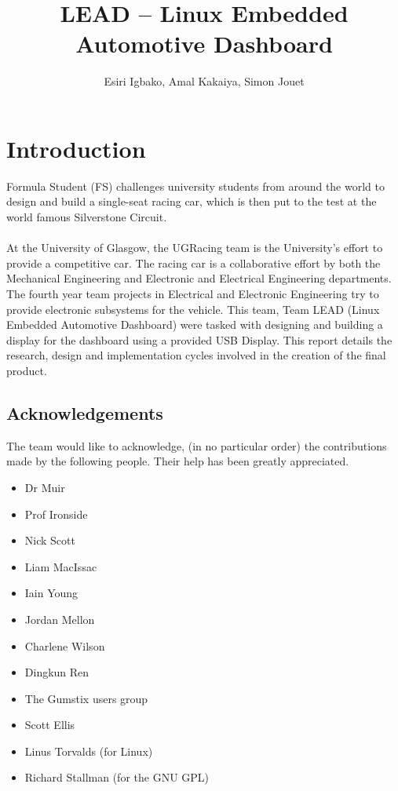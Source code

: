 \documentclass[11pt]{report} %
\title{LEAD -- Linux Embedded Automotive Dashboard}
\author{Esiri Igbako, Amal Kakaiya, Simon Jouet}
\begin{document}
\maketitle
\newpage
\tableofcontents
\newpage

\chapter{Introduction}
	Formula Student (FS) challenges university students from around the world
	to design and build a single-seat racing car, which is then put to the test
	at the world famous Silverstone Circuit. \\
	\\
	At the University of Glasgow, the UGRacing team is the University's effort
	to provide a competitive car.
	The racing car is a collaborative effort by both the Mechanical 
	Engineering and 
	Electronic and Electrical Engineering departments. The fourth year team
	projects in Electrical and Electronic Engineering try to provide 
	electronic subsystems for the vehicle. This team, Team LEAD (Linux 
	Embedded Automotive
	Dashboard) were tasked with designing and building a display for the 
	dashboard
	using a provided USB Display. This report details the 
	research, design and implementation cycles involved in the creation of the
	final product.
	
	\section{Acknowledgements}
	The team would like to acknowledge, (in no particular order) the contributions
	 made by the following
	people. Their help has been greatly appreciated.
	\begin{itemize}
		\item Dr Muir
		\item Prof Ironside
		\item Nick Scott
		\item Liam MacIssac
		\item Iain Young
		\item Jordan Mellon
		\item Charlene Wilson
		\item Dingkun Ren
		\item The Gumstix users group
		\item Scott Ellis
		\item Linus Torvalds (for Linux)
		\item Richard Stallman (for the GNU GPL)
	 \end{itemize} 
	
\end{document}
